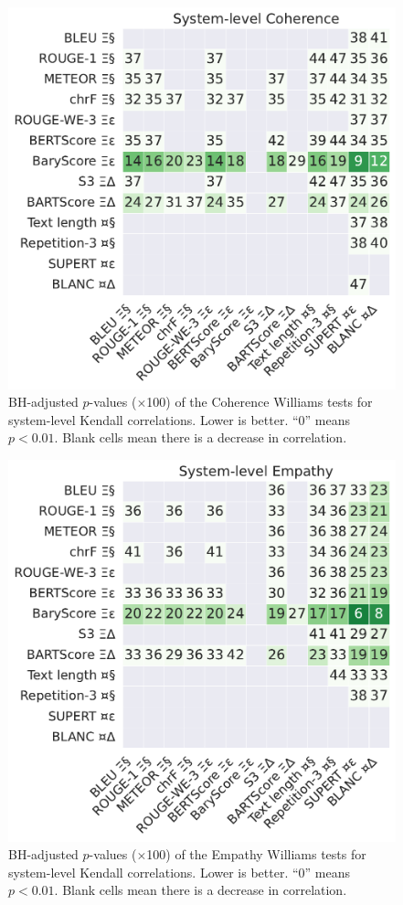 \begin{figure}[h]
    \centering
    \includegraphics[width=0.62\columnwidth]{pictures/williams_system_kendall_Coherence.pdf}
    \caption{BH-adjusted $p$-values ($\times$100) of the Coherence Williams tests for system-level Kendall correlations. Lower is better. ``0'' means $p<0.01$. Blank cells mean there is a decrease in correlation.}
    \label{fig:williams_system_coherence}
\end{figure}

\begin{figure}[h]
    \centering
    \includegraphics[width=0.62\columnwidth]{pictures/williams_system_kendall_Empathy.pdf}
    \caption{BH-adjusted $p$-values ($\times$100) of the Empathy Williams tests for system-level Kendall correlations. Lower is better. ``0'' means $p<0.01$. Blank cells mean there is a decrease in correlation.}
    \label{fig:williams_system_empathy}
\end{figure}


